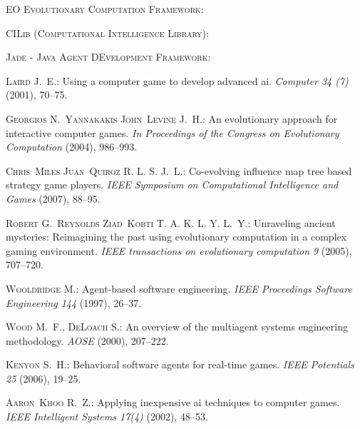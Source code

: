 \documentclass{egpubl}
\begin{document}
\begin{thebibliography}{\uppercase{JHM07}}
\textsc{EO Evolutionary Computation Framework}:

\textsc{CILib (Computational Intelligence Library)}:

\textsc{Jade - Java Agent DEvelopment Framework}:

\textsc{Laird J.~E.}:
\newblock Using a computer game to develop advanced ai.
\newblock \emph{Computer 34 (7)} (2001), 70--75.

\textsc{Georgios N.~Yannakakis John~Levine J.~H.}:
\newblock An evolutionary approach for interactive computer games.
\newblock \emph{In Proceedings of the Congress on Evolutionary Computation}
  (2004), 986--993.

\textsc{Chris~Miles Juan~Quiroz R. L. S. J.~L.}:
\newblock Co-evolving influence map tree based strategy game players.
\newblock \emph{IEEE Symposium on Computational Intelligence and Games} (2007),
  88--95.

\textsc{Robert G.~Reynolds Ziad~Kobti T. A. K. L. Y. L.~Y.}:
\newblock Unraveling ancient mysteries: Reimagining the past using evolutionary
  computation in a complex gaming environment.
\newblock \emph{IEEE transactions on evolutionary computation 9} (2005),
  707--720.

\textsc{Wooldridge M.}:
\newblock Agent-based software engineering.
\newblock \emph{IEEE Proceedings Software Engineering 144} (1997), 26--37.

\textsc{Wood M.~F., DeLoach S.}:
\newblock An overview of the multiagent systems engineering methodology.
\newblock \emph{AOSE} (2000), 207--222.

\textsc{Kenyon S.~H.}:
\newblock Behavioral software agents for real-time games.
\newblock \emph{IEEE Potentials 25} (2006), 19--25.

\textsc{Aaron~Khoo R.~Z.}:
\newblock Applying inexpensive ai techniques to computer games.
\newblock \emph{IEEE Intelligent Systems 17(4)} (2002), 48--53.

\end{thebibliography}
\end{document}
